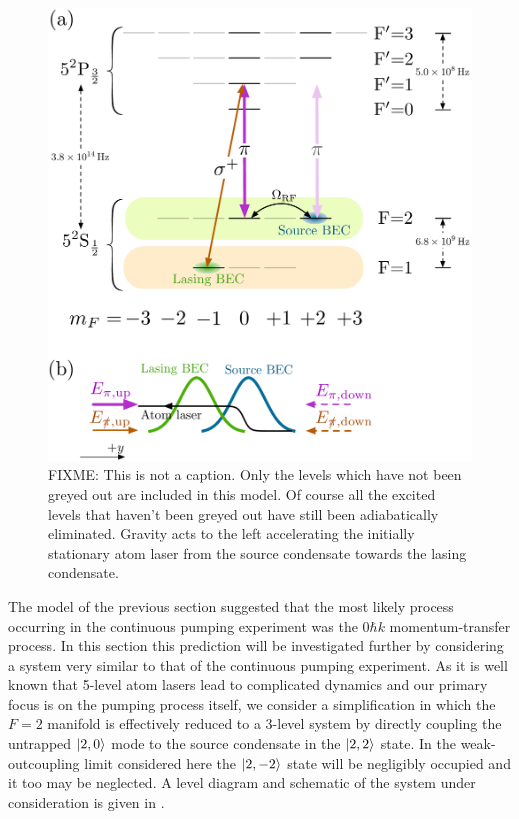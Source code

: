 \begin{figure}
    \centering
    \includegraphics[width=13cm]{3LevelModelLevelDiagram}
    \caption{FIXME: This is not a caption.  Only the levels which have not been greyed out are included in this model.  Of course all the excited levels that haven't been greyed out have still been adiabatically eliminated.  Gravity acts to the left accelerating the initially stationary atom laser from the source condensate towards the lasing condensate.}
    \label{OpticalPumping:3LevelModelLevelDiagram}
\end{figure}

The model of the previous section suggested that the most likely process occurring in the continuous pumping experiment was the $0 \hbar k$ momentum-transfer process.  In this section this prediction will be investigated further by considering a system very similar to that of the continuous pumping experiment.  As it is well known that 5-level atom lasers lead to complicated dynamics \citep{Dugue:2007fk} and our primary focus is on the pumping process itself, we consider a simplification in which the $F=2$ manifold is effectively reduced to a 3-level system by directly coupling the untrapped ${\left|2, 0\right>}$ mode to the source condensate in the ${\left|2, 2\right>}$ state.  In the weak-outcoupling limit considered here the ${\left|2, -2\right>}$ state will be negligibly occupied and it too may be neglected.  A level diagram and schematic of the system under consideration is given in .  

